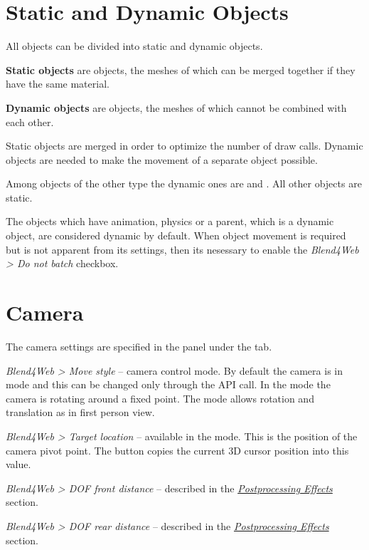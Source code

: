 \documentclass[a4paper,12pt,oneside]{sphinxmanual}
\begin{document}
\section{Static and Dynamic Objects}
\label{objects:id4}\label{objects:static-dynamic-objects}
All  objects can be divided into static and dynamic objects.

\textbf{Static objects} are objects, the meshes of which can be merged together if they have the same material.

\textbf{Dynamic objects} are objects, the meshes of which cannot be combined with each other.

Static objects are merged in order to optimize the number of draw calls. Dynamic objects are needed to make the movement of a separate object possible.

Among objects of the other type the dynamic ones are  and . All other objects are static.

The objects which have animation, physics or a parent, which is a dynamic object, are considered dynamic by default. When object movement is required but is not apparent from its settings, then its nesessary to enable the \emph{Blend4Web \textgreater{} Do not batch} checkbox.


\section{Camera}
\label{objects:id5}
The camera settings are specified in the  panel under the  tab.

\emph{Blend4Web \textgreater{} Move style} -- camera control mode. By default the camera is in  mode and this can be changed only through the API call. In the  mode the camera is rotating around a fixed point. The  mode allows rotation and translation as in first person view.

\emph{Blend4Web \textgreater{} Target location} -- available in the  mode. This is the position of the camera pivot point. The  button copies the current 3D cursor position into this value.

\emph{Blend4Web \textgreater{} DOF front distance} -- described in the {\hyperref[postprocessing_effects:postprocessing-effects]{\emph{Postprocessing Effects}}} section.

\emph{Blend4Web \textgreater{} DOF rear distance} -- described in the {\hyperref[postprocessing_effects:postprocessing-effects]{\emph{Postprocessing Effects}}} section.
\end{document}
